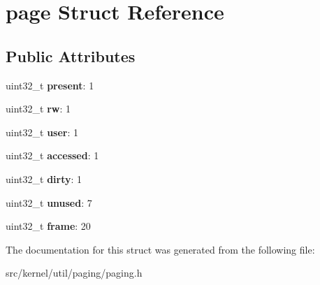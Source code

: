\hypertarget{structpage}{}\section{page Struct Reference}
\label{structpage}
\subsection*{Public Attributes}
\begin{DoxyCompactItemize}
\item 
\mbox{\label{structpage_a8133508fd1ae8a63bee9c51371cc8ceb}} 
uint32\+\_\+t {\bfseries present}\+: 1
\item 
\mbox{\label{structpage_aec0bfac2bc4417e3f309359a9237842e}} 
uint32\+\_\+t {\bfseries rw}\+: 1
\item 
\mbox{\label{structpage_a63c94425565e8139f3267081b858ad40}} 
uint32\+\_\+t {\bfseries user}\+: 1
\item 
\mbox{\label{structpage_af62d1b3f6b1d20f79aa9f58c1d98ae85}} 
uint32\+\_\+t {\bfseries accessed}\+: 1
\item 
\mbox{\label{structpage_a8ec3a8a2015a64a6ece9eec41a313c47}} 
uint32\+\_\+t {\bfseries dirty}\+: 1
\item 
\mbox{\label{structpage_a13059404d2d982570fd49ecc0efc7803}} 
uint32\+\_\+t {\bfseries unused}\+: 7
\item 
\mbox{\label{structpage_ac75e801a4067bcc6718e1191c354aff8}} 
uint32\+\_\+t {\bfseries frame}\+: 20
\end{DoxyCompactItemize}


The documentation for this struct was generated from the following file\+:\begin{DoxyCompactItemize}
\item 
src/kernel/util/paging/paging.\+h\end{DoxyCompactItemize}
